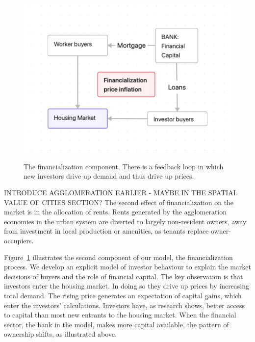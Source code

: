 \begin{figure}[!ht]
    \centering
    \includegraphics[scale=.70]{fig/flow_financialization.png}
    \label{fig-financial-cycle}
    \caption[The financialization component of the model.]{The financialization component. There is a feedback loop in which new investors drive up demand and thus drive up prices.}
\end{figure}

INTRODUCE AGGLOMERATION EARLIER - MAYBE IN THE SPATIAL VALUE OF CITIES SECTION?
The second effect of financialization on the market is in the allocation of rents. Rents generated by the \gls{agglomeration} economies in the urban system are diverted to largely non-resident owners, away from investment in local production or amenities, as tenants replace owner-occupiers. %

Figure~\ref{fig-financial-cycle} illustrates the second component of our model, the financialization process. We develop an explicit model of investor behaviour to explain the market decisions of buyers and the role of financial capital. The key observation is that investors enter the housing market. In doing so they drive up prices by increasing total demand. The rising price generates an expectation of capital gains, which enter the investors' calculations. Investors have, as research shows, better access to capital than most new entrants to the housing market. When the financial sector, the bank in the model, makes more capital available, the pattern of ownership shifts, as illustrated above. %

